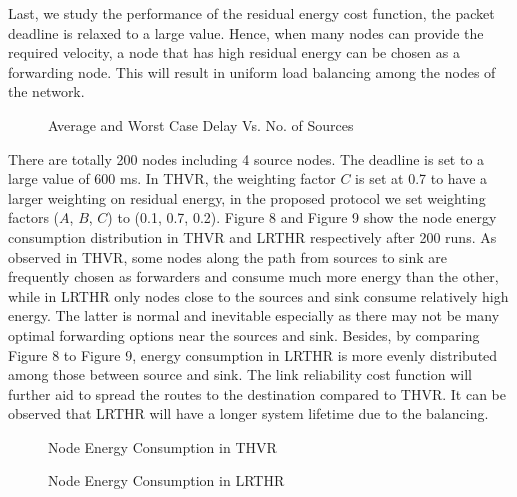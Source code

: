 \documentclass[fleqn,twoside]{article}
\begin{document}
Last, we study the performance of the residual energy cost function, the packet deadline is relaxed to a large value. Hence, when many
nodes can provide the required velocity, a node that has high residual energy can be chosen as a forwarding node. This will result in uniform load balancing among the nodes of the network.


\begin{figure}
\begin{center}
\begin{small}
\caption{Average and Worst Case Delay Vs. No. of Sources}
\end{small}
\end{center}
\end{figure}

There are totally 200 nodes including 4 source nodes. The deadline is set to a large value of 600 ms. In THVR, the weighting factor $C$ 
is set at 0.7 to have a larger weighting on residual energy, in the proposed protocol we set weighting factors ($A$, $B$, $C$) to (0.1, 0.7, 0.2). Figure 8 and Figure 9 show the node energy consumption distribution in THVR and LRTHR respectively after 200 runs. 
As observed in THVR, some nodes along the path from
sources to sink are frequently chosen as forwarders and consume much more energy than the other, while in LRTHR only nodes close to the sources and sink consume relatively high energy. The latter is normal and inevitable especially as there may not be many optimal forwarding options near the sources and sink. Besides, by comparing Figure 8 to Figure 9, energy consumption in LRTHR is more evenly distributed among those between source and sink. The link reliability cost function will further aid to spread the routes to the destination compared to THVR. It can be observed that LRTHR will have a longer system lifetime due to the balancing.



\begin{figure}
\begin{center}
\begin{small}
\caption{Node Energy Consumption in THVR}
\end{small}
\end{center}
\end{figure}

\begin{figure}
\begin{center}
\begin{small}
\caption{Node Energy Consumption in LRTHR}
\end{small}
\end{center}
\end{figure}
\end{document}
